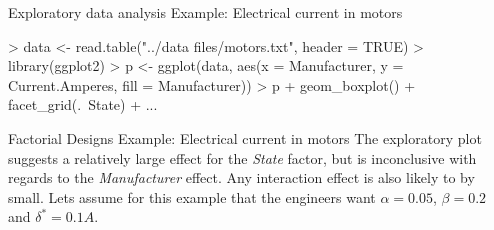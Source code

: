 \documentclass[t]{beamer}
\begin{document}

\begin{ftstf}
{Exploratory data analysis}
{Example: Electrical current in motors}
\begin{rcode}
> data <- read.table("../data files/motors.txt", header = TRUE)
> library(ggplot2)
> p <- ggplot(data, aes(x = Manufacturer, y = Current.Amperes, fill = Manufacturer))
> p + geom_boxplot() + facet_grid(.~State) + ...
\end{rcode}

\end{ftstf}


\begin{ftst}
{Factorial Designs}
{Example: Electrical current in motors}
The exploratory plot suggests a relatively large effect for the \textit{State} factor, but is inconclusive with regards to the \textit{Manufacturer} effect. Any interaction effect is also likely to by small.
\vhalf
Lets assume for this example that the engineers want $\alpha = 0.05$, $\beta = 0.2$ and $\delta^* = 0.1 A$.
\end{ftst}
\end{document}
